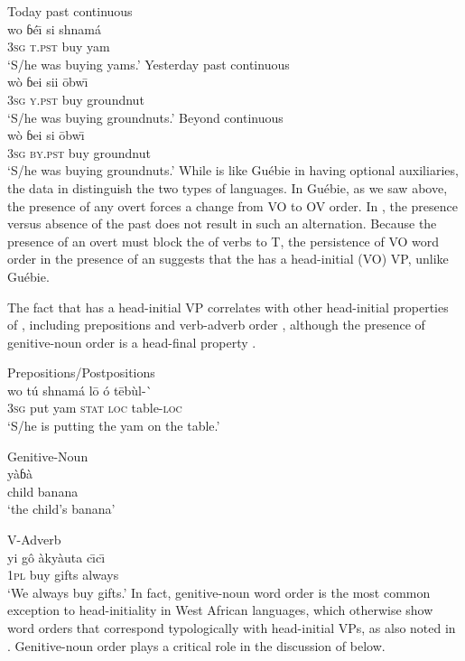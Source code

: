 \documentclass[output=paper,newtxmath,modfonts,nonflat,draftmode]{langsci/langscibook}
\begin{document}
\ea \label{ex:11:gwari}
\ea  Today past continuous	\\
\gll wo {ɓé\=\i} si shnamá\\
3\textsc{sg} \textsc{t.pst} buy yam \\
\glt `S/he was buying yams.' \hfill \citep[][54]{hyman1970}
\ex Yesterday past continuous	\\
\gll wò {ɓei} sii {\=obw\=\i }\\
3\textsc{sg} \textsc{y.pst} buy groundnut\\
\glt `S/he was buying groundnuts.' \hfill \citep[][54]{hyman1970}
\ex Beyond  continuous	\\
\gll wò {ɓei} si {\=obw\=\i } \\
3\textsc{sg} \textsc{by.pst} buy groundnut \\
\glt `S/he was buying groundnuts.' \hfill \citep[][54]{hyman1970}
\z
\z
While  is like Guébie in having optional auxiliaries, the data in  distinguish the two types of languages. In Guébie, as we saw above, the presence of any overt  forces a change from VO to OV order. In , the presence versus absence of the past  does not result in such an alternation. Because the presence of an overt  must block the  of verbs to T, the persistence of VO word order in the presence of an  suggests that the  has a head-initial (VO) VP, unlike Guébie.

The fact that  has a head-initial VP correlates with other head-initial properties of , including prepositions  and verb-adverb order , although the presence of genitive-noun order is a head-final property . 

\ea
\ea  \label{ex:12a:gwari} {Prepositions/Postpositions}\\
\gll wo tú shnamá l\=o ó t\=ebùl-\`{} \\
3\textsc{sg} put yam \textsc{stat} \textsc{loc} table-\textsc{loc} \\
\glt `S/he is putting the yam on the table.'

\ex \label{ex:12b:gwari} {Genitive-Noun}\\
 {yàɓà}\\
child banana \\
\glt `the child's banana' \hfill \citep[][25]{hyman1970}

\ex \label{ex:12c:gwari} {V-Adverb}\\
\gll yi gô àkyàuta {c\=\i c\=\i} \\
1\textsc{pl} buy gifts always \\
\glt `We always buy gifts.' \hfill \citep[][51]{hyman1970}
\z
\z
In fact, genitive-noun word order is the most common exception to head-initiality in West African languages, which otherwise show word orders that correspond typologically with head-initial VPs, as also noted in \citet{heine76}. Genitive-noun order plays a critical role in the discussion of  below.
\end{document}
